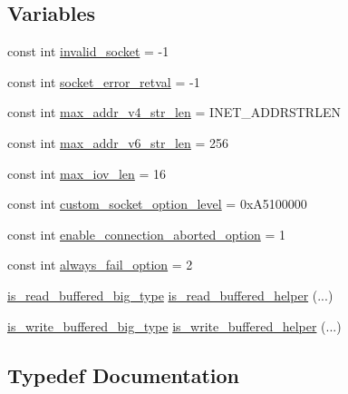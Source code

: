 \subsection*{Variables}
\begin{DoxyCompactItemize}
\item 
const int \hyperlink{namespaceasio_1_1detail_acb107bcaaeb6ee70f25604a6da8fd0b3}{invalid\+\_\+socket} = -\/1
\item 
const int \hyperlink{namespaceasio_1_1detail_a8dfb40730cf1169dd3fa94e43a7abf89}{socket\+\_\+error\+\_\+retval} = -\/1
\item 
const int \hyperlink{namespaceasio_1_1detail_a286f3216bbf2141a8cf666a7506ee6f0}{max\+\_\+addr\+\_\+v4\+\_\+str\+\_\+len} = I\+N\+E\+T\+\_\+\+A\+D\+D\+R\+S\+T\+R\+L\+E\+N
\item 
const int \hyperlink{namespaceasio_1_1detail_aa1c15a2c48591aee5952bc2f2124424d}{max\+\_\+addr\+\_\+v6\+\_\+str\+\_\+len} = 256
\item 
const int \hyperlink{namespaceasio_1_1detail_aa32324a2be9dbcadc7f55700d8d31df9}{max\+\_\+iov\+\_\+len} = 16
\item 
const int \hyperlink{namespaceasio_1_1detail_ac87c0ec12e7071c1f18513b04a627a24}{custom\+\_\+socket\+\_\+option\+\_\+level} = 0x\+A5100000
\item 
const int \hyperlink{namespaceasio_1_1detail_a4d541df87cf6415ae4d57937476bb361}{enable\+\_\+connection\+\_\+aborted\+\_\+option} = 1
\item 
const int \hyperlink{namespaceasio_1_1detail_a9a0de25b02f8e9540fe34ccad54988a3}{always\+\_\+fail\+\_\+option} = 2
\item 
\hyperlink{structasio_1_1detail_1_1is__read__buffered__big__type}{is\+\_\+read\+\_\+buffered\+\_\+big\+\_\+type} \hyperlink{namespaceasio_1_1detail_ac51ba8a0b2cbbab69d47430bb1f61b14}{is\+\_\+read\+\_\+buffered\+\_\+helper} (...)
\item 
\hyperlink{structasio_1_1detail_1_1is__write__buffered__big__type}{is\+\_\+write\+\_\+buffered\+\_\+big\+\_\+type} \hyperlink{namespaceasio_1_1detail_a92c09d4f26720d51674e29602933009c}{is\+\_\+write\+\_\+buffered\+\_\+helper} (...)
\end{DoxyCompactItemize}


\subsection{Typedef Documentation}
\hypertarget{namespaceasio_1_1detail_ad8df56a17e3aa9ce2ad251fb76426e67}{}
